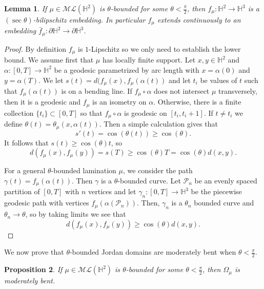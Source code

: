 \documentclass{amsart}
\theoremstyle{plain}
\newtheorem{proposition}{Proposition}[section]
\newtheorem{lemma}[proposition]{Lemma}
\theoremstyle{definition}
\theoremstyle{remark}
\newcommand{\Hp}{{\mathbb H}^2}
\newcommand{\<}{\left <}
\renewcommand{\>}{\right >}
\begin{document}
\begin{lemma}
If $\mu\in \mathcal{ML}(\Hp)$ is $\theta$-bounded for some $\theta <\frac{\pi}{2}$, then $f_\mu:\mathbb H^2 \rightarrow \mathbb H^3$ is a $(\sec\theta)$-bilipschitz
embedding. In particular $f_\mu$ extends continuously to an embedding
$\bar f_\mu:\partial\mathbb H^2\to\partial \mathbb H^3$.
\end{lemma}

\begin{proof}
By definition $f_\mu$ is $1$-Lipschitz so we only need to establish the lower bound.  We assume first that $\mu$ has locally finite support. 
Let $x,y\in \mathbb H^2$  and $\alpha:[0,T]\rightarrow \mathbb H^2$ be a geodesic parametrized by arc length with 
$x = \alpha(0)$ and $y=\alpha(T)$. We let $s(t) = d(f_\mu(x), f_\mu(\alpha(t))$ and let $t_i$ be values of $t$ such that $f_\mu(\alpha(t))$  
is on a  bending line. If $f_\mu\circ \alpha$ does not intersect  $\mu$ transversely, then it is a geodesic and $f_\mu$ is an isometry on $\alpha$. 
Otherwise, there is a finite collection $\{t_i\}\subset [0,T]$ so that $f_\mu\circ \alpha$ is geodesic on $[t_i,t_i+1]$.
If $t\neq t_i$  we define $\theta(t) = \theta_\mu(x, \alpha(t))$. Then a simple calculation gives that
$$s'(t) = \cos(\theta(t)) \geq \cos(\theta).$$
It follows that $s(t) \geq \cos(\theta)t$, so
$$d(f_\mu(x), f_\mu(y)) = s(T) \geq \cos(\theta)T = \cos(\theta)d(x,y).$$

For a general $\theta$-bounded lamination $\mu$, we consider the path $\gamma(t) = f_\mu(\alpha(t))$. 
Then $\gamma$ is a $\theta$-bounded curve. Let $\mathcal P_n$ be an evenly spaced partition of 
$[0,T]$ with $n$ vertices and let $\gamma_n:[0,T]\rightarrow \mathbb H^3$ 
be the piecewise geodesic path with vertices $f_\mu(\alpha(\mathcal P_n))$. 
Then, $\gamma_n$ is a $\theta_n$ bounded curve and $\theta_n \rightarrow \theta$, so by taking limits we see that
$$d(f_\mu(x), f_\mu(y)) \geq \cos(\theta)d(x,y).$$
\end{proof}

We now prove that $\theta$-bounded Jordan domains are moderately bent when $\theta<\frac{\pi}{2}$.
 
\begin{proposition}\label{theta-mod}
If $\mu\in \mathcal{ML}(\Hp)$ is $\theta$-bounded for some $\theta <\frac{\pi}{2}$, then $\Omega_\mu$ is moderately bent.
\end{proposition}
\end{document}
